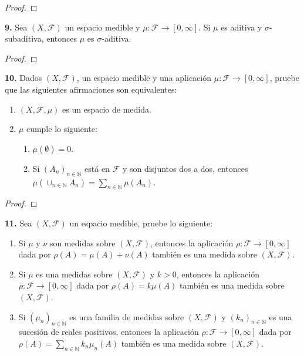 \documentclass{article}
\newenvironment{statement}[1]{\smallskip\noindent\color[rgb]{1.00,0.00,0.50} {\bf #1.}}{}
\theoremstyle{definition}
\theoremstyle{remark}
\newcommand{\BN}{\mathbb N}
\begin{document}
\begin{proof}
\end{proof}

\begin{statement}{9}
  Sea $(X, \mathcal{F})$ un espacio medible y $\mu: \mathcal{F} \to [0, \infty]$. Si $\mu$ es aditiva y $\sigma$-subaditiva, entonces $\mu$ es $\sigma$-aditiva.
\end{statement}

\begin{proof}
\end{proof}

\begin{statement}{10}
  Dados $(X, \mathcal{F})$, un espacio medible y una aplicaci\'on $\mu: \mathcal{F} \to [0, \infty]$, pruebe que las siguientes afirmaciones son equivalentes:
  \begin{enumerate}
    \item $(X, \mathcal{F}, \mu)$ es un espacio de medida.
    \item $\mu$ cumple lo siguiente:
      \begin{enumerate}
        \item $\mu(\emptyset) = 0$.
        \item Si $(A_n)_{n \in \BN}$ est\'a en $\mathcal{F}$ y son disjuntos dos a dos, entonces $\mu(\cup_{n \in \BN} A_n) = \sum_{n \in \BN} \mu(A_n)$.
      \end{enumerate}
  \end{enumerate}
\end{statement}

\begin{proof}
\end{proof}

\begin{statement}{11}
  Sea $(X, \mathcal{F})$ un espacio medible, pruebe lo siguiente:
  \begin{enumerate}
    \item Si $\mu$ y $\nu$ son medidas sobre $(X, \mathcal{F})$, entonces la aplicaci\'on $\rho: \mathcal{F} \to [0, \infty]$ dada por $\rho(A) = \mu(A) + \nu(A)$ tambi\'en es una medida sobre $(X, \mathcal{F})$.
    \item Si $\mu$ es una medidas sobre $(X, \mathcal{F})$ y $k > 0$, entonces la aplicaci\'on $\rho: \mathcal{F} \to [0, \infty]$ dada por $\rho(A) = k \mu(A)$ tambi\'en es una medida sobre $(X, \mathcal{F})$.
    \item Si $(\mu_n)_{n \in \BN}$ es una familia de medidas sobre $(X, \mathcal{F})$ y $(k_n)_{n \in \BN}$ es una sucesi\'on de reales positivos, entonces la aplicaci\'on $\rho: \mathcal{F} \to [0, \infty]$ dada por $\rho(A) = \sum_{n \in \BN} k_n \mu_n(A)$ tambi\'en es una medida sobre $(X, \mathcal{F})$.
  \end{enumerate}
\end{statement}
\end{document}
